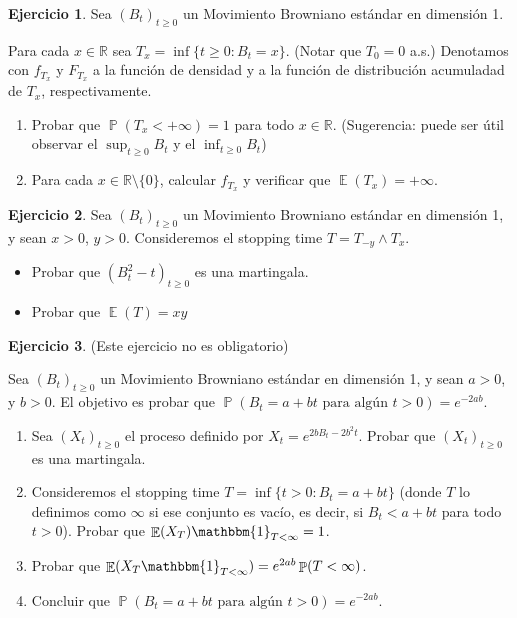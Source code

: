 \documentclass{article}
\DeclareMathOperator{\prob}{\mathbb{P}}
\DeclareMathOperator{\Exp}{\mathbb{E}}
\newcommand{\realnum}{\mathbb{R}}
\newcommand{\characteristic}{\mathbbm{1}}
\theoremstyle{definition}
\newtheorem{exercise}{Ejercicio}
\begin{document}
\endgroup

\begin{exercise}
Sea $(B_t)_{t \geq 0}$ un Movimiento Browniano estándar en dimensión 1.

Para cada $x \in \realnum$ sea $T_x = \inf \{t \geq 0 : B_t = x\}$.
(Notar que \(T_0 = 0\) a.s.)
Denotamos con \(f_{T_x}\) y \(F_{T_x}\) a la función de densidad y a la función de distribución acumuladad de \(T_x\), respectivamente.
\begin{enumerate}[label=\alph*)]
	\item Probar que \(\prob(T_x < + \infty) = 1\) para todo \(x \in \realnum\).
	(Sugerencia: puede ser útil observar el \(\sup_{t \geq 0} B_t\) y el \(\inf_{t \geq 0} B_t\))
	\item Para cada \(x \in \realnum \setminus \{0\}\), calcular \(f_{T_x}\) y verificar que \(\Exp(T_x) = + \infty\).
\end{enumerate}
\end{exercise}

\begin{exercise}
Sea \((B_t)_{t \geq 0}\) un Movimiento Browniano estándar en dimensión 1, y sean \(x > 0\), \(y > 0\).
Consideremos el stopping time \(T = T_{- y} \wedge T_x\).
\begin{itemize}
	\item Probar que \((B_t^2 - t)_{t \geq 0}\) es una martingala.
	\item Probar que \(\Exp(T) = xy\)
\end{itemize}
\end{exercise}

\begin{exercise}
(Este ejercicio no es obligatorio)

Sea \((B_t)_{t \geq 0}\) un Movimiento Browniano estándar en dimensión 1, y sean \(a > 0\), y \(b > 0\).
El objetivo es probar que \(\prob(B_t = a + b t \text{ para algún } t > 0) = e^{- 2 a b}\).
\begin{enumerate}[label=\alph*)]
	\item Sea \((X_t)_{t \geq 0}\) el proceso definido por \(X_t = e^{2 b B_t - 2 b^2 t}\).
	Probar que \((X_t)_{t \geq 0}\) es una martingala.
	\item Consideremos el stopping time \(T = \inf \{t > 0 : B_t = a + b t\}\) (donde \(T\) lo definimos como \(\infty\) si ese conjunto es vacío, es decir, si \(B_t < a + b t\) para todo \(t > 0\)).
	Probar que \(\Exp(X_T) \characteristic_{T < \infty} = 1\).
	\item Probar que \(\Exp(X_T \characteristic_{T < \infty}) = e^{2 a b} \prob(T < \infty)\).
	\item Concluir que \(\prob(B_t = a + b t\text{ para algún } t > 0) = e^{- 2 a b}\).
\end{enumerate}
\end{exercise}
\end{document}
